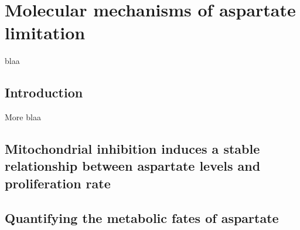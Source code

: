 \chapter{Molecular mechanisms of aspartate limitation}
blaa

\section{Introduction}
More blaa




\section{Mitochondrial inhibition induces a stable relationship between aspartate levels and proliferation rate}







\section{Quantifying the metabolic fates of aspartate}


